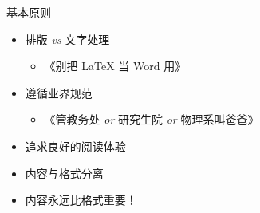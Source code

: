 \begin{frame}{基本原则}
\begin{itemize}
  \item 排版 \textit{vs} 文字处理
    \begin{itemize}
      \item 《别把 \LaTeX{} 当 Word 用》
    \end{itemize}
  \item 遵循业界规范
    \begin{itemize}
      \item 《管教务处 \textit{or} 研究生院 \textit{or} 物理系叫爸爸》
    \end{itemize}
  \item 追求良好的阅读体验
  \item 内容与格式分离
  \item \alert{内容永远比格式重要！}
\end{itemize}
\end{frame}
